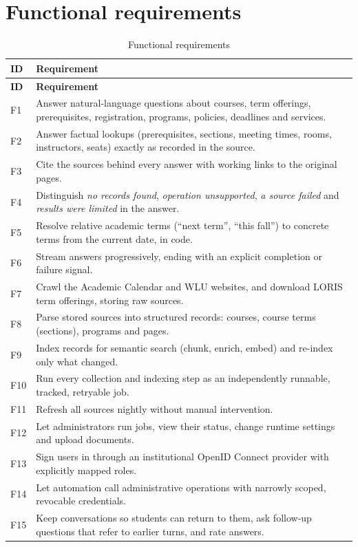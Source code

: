 \documentclass[11pt,letterpaper]{report}
\begin{document}
\section{Functional requirements}
\begin{longtable}{@{}P{1.1cm}P{14.3cm}@{}}
\caption{Functional requirements}\label{tab:fr}\\
\toprule
\textbf{ID} & \textbf{Requirement} \\
\midrule
\endfirsthead
\toprule
\textbf{ID} & \textbf{Requirement} \\
\midrule
\endhead
F1 & Answer natural-language questions about courses, term offerings, prerequisites, registration, programs, policies, deadlines and services. \\
F2 & Answer factual lookups (prerequisites, sections, meeting times, rooms, instructors, seats) exactly as recorded in the source. \\
F3 & Cite the sources behind every answer with working links to the original pages. \\
F4 & Distinguish \emph{no records found}, \emph{operation unsupported}, \emph{a source failed} and \emph{results were limited} in the answer. \\
F5 & Resolve relative academic terms (``next term'', ``this fall'') to concrete terms from the current date, in code. \\
F6 & Stream answers progressively, ending with an explicit completion or failure signal. \\
F7 & Crawl the Academic Calendar and WLU websites, and download LORIS term offerings, storing raw sources. \\
F8 & Parse stored sources into structured records: courses, course terms (sections), programs and pages. \\
F9 & Index records for semantic search (chunk, enrich, embed) and re-index only what changed. \\
F10 & Run every collection and indexing step as an independently runnable, tracked, retryable job. \\
F11 & Refresh all sources nightly without manual intervention. \\
F12 & Let administrators run jobs, view their status, change runtime settings and upload documents. \\
F13 & Sign users in through an institutional OpenID Connect provider with explicitly mapped roles. \\
F14 & Let automation call administrative operations with narrowly scoped, revocable credentials. \\
F15 & Keep conversations so students can return to them, ask follow-up questions that refer to earlier turns, and rate answers. \\
\bottomrule
\end{longtable}
\end{document}
